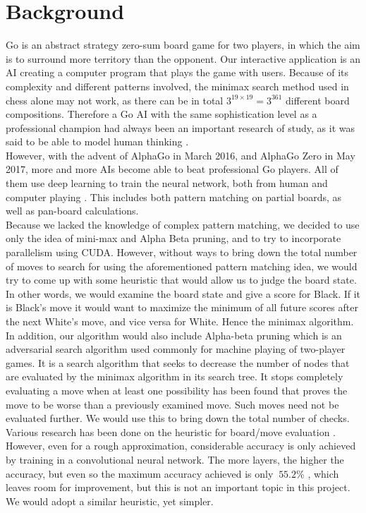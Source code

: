 \documentclass[11pt]{article}
\begin{document}
\section*{Background}
Go is an abstract strategy zero-sum board game for two players, in which the aim is to surround more territory than the opponent. Our interactive application is an AI creating a computer program that plays the game with users. Because of its complexity and different patterns involved, the minimax search method used in chess alone may not work, as there can be in total $3^{19 \times 19} = 3^{361}$ different board compositions. Therefore a Go AI with the same sophistication level as a professional champion had always been an important research of study, as it was said to be able to model human thinking \cite{SN}.
\\
However, with the advent of AlphaGo in March 2016, and AlphaGo Zero in May 2017, more and more AIs become able to beat professional Go players. All of them use deep learning to train the neural network, both from human and computer playing \cite{NA}. This includes both pattern matching on partial boards, as well as pan-board calculations.\\
Because we lacked the knowledge of complex pattern matching, we decided to use only the idea of mini-max and Alpha Beta pruning, and to try to incorporate parallelism using CUDA. However, without ways to bring down the total number of moves to search for using the aforementioned pattern matching idea, we would try to come up with some heuristic that would allow us to judge the board state. In other words, we would examine the board state and give a score for Black. If it is Black's move it would want to maximize the minimum of all future scores after the next White's move, and vice versa for White. Hence the minimax algorithm.
In addition, our algorithm would also include Alpha-beta pruning which is an adversarial search algorithm used commonly for machine playing of two-player games. It is a search algorithm that seeks to decrease the number of nodes that are evaluated by the minimax algorithm in its search tree. It stops completely evaluating a move when at least one possibility has been found that proves the move to be worse than a previously examined move. Such moves need not be evaluated further. We would use this to bring down the total number of checks. \\
Various research has been done on the heuristic for board/move evaluation \cite{ME}. However, even for a rough approximation, considerable accuracy is only achieved by training in a convolutional neural network. The more layers, the higher the accuracy, but even so the maximum accuracy achieved is only $ \ 55.2\%$ \cite{ME}, which leaves room for improvement, but this is not an important topic in this project. We would adopt a similar heuristic, yet simpler.
\end{document}
